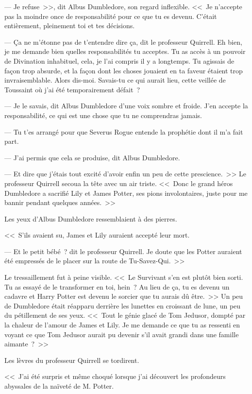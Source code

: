 --- Je refuse~>>, dit Albus Dumbledore, son regard inflexible. <<~Je n'accepte pas la moindre once de responsabilité pour ce que tu es devenu. C'était entièrement, pleinement toi et tes décisions.

--- Ça ne m'étonne pas de t'entendre dire ça, dit le professeur Quirrell. Eh bien, je me demande bien quelles responsabilités tu acceptes. Tu as accès à un pouvoir de Divination inhabituel, cela, je l'ai compris il y a longtemps. Tu agissais de façon trop absurde, et la façon dont les choses jouaient en ta faveur étaient trop invraisemblable. Alors dis-moi. Savais-tu ce qui aurait lieu, cette veillée de Toussaint où j'ai été temporairement défait~?

--- Je le savais, dit Albus Dumbledore d'une voix sombre et froide. J'en accepte la responsabilité, ce qui est une chose que tu ne comprendras jamais.

--- Tu t'es arrangé pour que Severus Rogue entende la prophétie dont il m'a fait part.

--- J'ai permis que cela se produise, dit Albus Dumbledore.

--- Et dire que j'étais tout excité d'avoir enfin un peu de cette prescience.~>> Le professeur Quirrell secoua la tête avec un air triste. <<~Donc le grand héros Dumbledore a sacrifié Lily et James Potter, ses pions involontaires, juste pour me bannir pendant quelques années.~>>

Les yeux d'Albus Dumbledore ressemblaient à des pierres.

<<~S'ils avaient su, James et Lily auraient accepté leur mort.

--- Et le petit bébé~? dit le professeur Quirrell. Je doute que les Potter auraient été empressés de le placer sur la route de Tu-Savez-Qui.~>>

Le tressaillement fut à peine visible. <<~Le Survivant s'en est plutôt bien sorti. Tu as essayé de le transformer en toi, hein~? Au lieu de ça, tu es devenu un cadavre et Harry Potter est devenu le sorcier que tu aurais dû être.~>> Un peu de Dumbledore était réapparu derrière les lunettes en croissant de lune, un peu du pétillement de ses yeux. <<~Tout le génie glacé de Tom Jedusor, dompté par la chaleur de l'amour de James et Lily. Je me demande ce que tu as ressenti en voyant ce que Tom Jedusor aurait pu devenir s'il avait grandi dans une famille aimante~?~>>

Les lèvres du professeur Quirrell se tordirent.

<<~J'ai été surpris et même choqué lorsque j'ai découvert les profondeurs abyssales de la naïveté de M. Potter.

